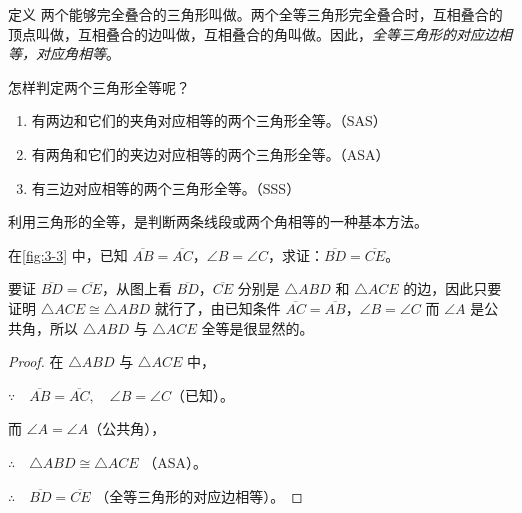 \begin{figure}
    \centering
{}
    \caption{}\label{fig:3-2}
\end{figure}

\begin{Definition}{定义}
两个能够完全叠合的三角形叫做。两个全等三角形完全叠合时，互相叠合的顶点叫做，互相叠合的边叫做，互相叠合的角叫做。因此，\emph{全等三角形的对应边相等，对应角相等}。
\end{Definition}
 
怎样判定两个三角形全等呢？
\begin{enumerate}
  \item 有两边和它们的夹角对应相等的两个三角形全等。（SAS）
  \item 有两角和它们的夹边对应相等的两个三角形全等。（ASA）
  \item 有三边对应相等的两个三角形全等。（SSS）
\end{enumerate}

利用三角形的全等，是判断两条线段或两个角相等的一种基本方法。

\begin{example}
在\cref{fig:3-3} 中，已知 $\overline{AB}=\overline{AC}$，$\angle B=\angle C$，求证：$\overline{BD}=\overline{CE}$。
\end{example}

\begin{analyze}
要证 $\overline{BD}=\overline{CE}$，从图上看 $\overline{BD}$，$\overline{CE}$ 分别是 $\triangle ABD$ 和 $\triangle ACE$ 的边，因此只要证明 $\triangle ACE \cong \triangle ABD$ 就行了，由已知条件 $\overline{AC}=\overline{AB}$，$\angle B=\angle C$ 而 $\angle A$ 是公共角，所以 $\triangle ABD$ 与 $\triangle ACE$ 全等是很显然的。
\end{analyze}

\begin{proof}
在 $\triangle ABD$ 与 $\triangle ACE$ 中，

$\because\quad \overline{AB}=\overline{AC},\quad \angle B=\angle C$（已知）。

而 $\angle A=\angle A$（公共角），

$\therefore\quad \triangle ABD\cong \triangle ACE$ （ASA）。

$\therefore\quad \overline{BD}=\overline{CE}$ （全等三角形的对应边相等）。
\end{proof}    


